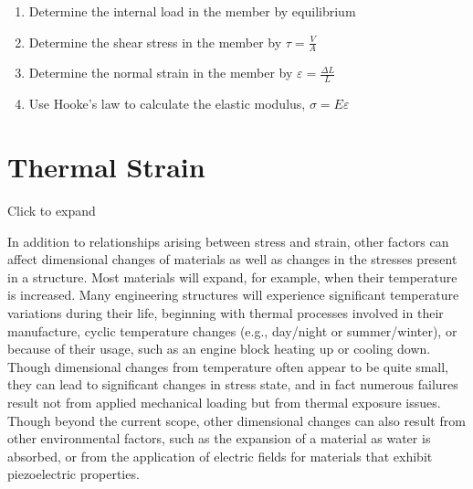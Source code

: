 \documentclass[
  letterpaper,
  DIV=11,
  numbers=noendperiod]{scrreprt}
\providecommand{\tightlist}{%
  \setlength{\itemsep}{0pt}\setlength{\parskip}{0pt}}\usepackage{longtable,booktabs,array}
\theoremstyle{definition}
\theoremstyle{remark}
\begin{document}
\begin{tcolorbox}[enhanced jigsaw, leftrule=.75mm, colbacktitle=quarto-callout-warning-color!10!white, breakable, opacityback=0, colback=white, titlerule=0mm, toprule=.15mm, colframe=quarto-callout-warning-color-frame, coltitle=black, title={Step-by-step:}, toptitle=1mm, bottomrule=.15mm, rightrule=.15mm, left=2mm, arc=.35mm, opacitybacktitle=0.6, bottomtitle=1mm]

\begin{enumerate}
\def\labelenumi{\arabic{enumi}.}
\tightlist
\item
  Determine the internal load in the member by equilibrium
\item
  Determine the shear stress in the member by \(\tau=\frac{V}{A}\)
\item
  Determine the normal strain in the member by
  \(\varepsilon=\frac{\Delta L}{L}\)
\item
  Use Hooke's law to calculate the elastic modulus,
  \(\sigma=E \varepsilon\)
\end{enumerate}

\end{tcolorbox}

\section{Thermal Strain}\label{sec-4.6}

Click to expand

In addition to relationships arising between stress and strain, other
factors can affect dimensional changes of materials as well as changes
in the stresses present in a structure. Most materials will expand, for
example, when their temperature is increased. Many engineering
structures will experience significant temperature variations during
their life, beginning with thermal processes involved in their
manufacture, cyclic temperature changes (e.g., day/night or
summer/winter), or because of their usage, such as an engine block
heating up or cooling down. Though dimensional changes from temperature
often appear to be quite small, they can lead to significant changes in
stress state, and in fact numerous failures result not from applied
mechanical loading but from thermal exposure issues. Though beyond the
current scope, other dimensional changes can also result from other
environmental factors, such as the expansion of a material as water is
absorbed, or from the application of electric fields for materials that
exhibit piezoelectric properties.
\end{document}
